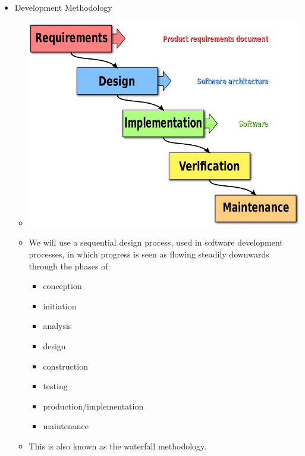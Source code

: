 \begin{itemize}
	\item Development Methodology
	\begin{itemize}
	\item []\includegraphics[scale=0.3]{./Images/Waterfall.png}
		\item[] We will use a sequential design process, used in software development processes, in which progress is seen as flowing steadily downwards through the phases of: 
		\begin{itemize}
			\item conception 
			\item initiation
			\item analysis
			\item design
			\item construction
			\item testing
			\item production/implementation
			\item maintenance
		\end{itemize}		 %
		\item[] This is also known as the waterfall methodology.
	\end{itemize}
	

\end{itemize}
